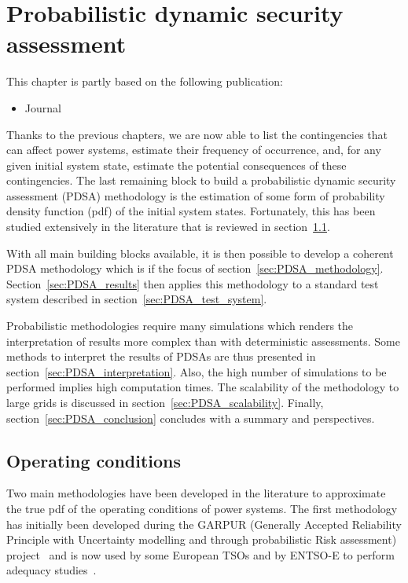 \chapter{Probabilistic dynamic security assessment}
\label{ch:DPSA}
\minitoc

\begin{tcolorbox}[width=\linewidth, sharp corners=all,
    colback=white!80!black,
    colframe=white!80!black]
This chapter is partly based on the following publication:
\begin{itemize}
    \item Journal
\end{itemize}
\end{tcolorbox}

Thanks to the previous chapters, we are now able to list the contingencies that can affect power systems, estimate their frequency of occurrence, and, for any given initial system state, estimate the potential consequences of these contingencies. The last remaining block to build a probabilistic dynamic security assessment (PDSA) methodology is the estimation of some form of probability density function (pdf) of the initial system states. Fortunately, this has been studied extensively in the literature that is reviewed in section~\ref{sec:operating_conditions}.

With all main building blocks available, it is then possible to develop a coherent PDSA methodology which is if the focus of section~\ref{sec:PDSA_methodology}. Section~\ref{sec:PDSA_results} then applies this methodology to a standard test system described in section~\ref{sec:PDSA_test_system}.

Probabilistic methodologies require many simulations which renders the interpretation of results more complex than with deterministic assessments. Some methods to interpret the results of PDSAs are thus presented in section~\ref{sec:PDSA_interpretation}. Also, the high number of simulations to be performed implies high computation times. The scalability of the methodology to large grids is discussed in section~\ref{sec:PDSA_scalability}. Finally, section~\ref{sec:PDSA_conclusion} concludes with a summary and perspectives.



\section{Operating conditions}
\label{sec:operating_conditions}

Two main methodologies have been developed in the literature to approximate the true pdf of the operating conditions of power systems. The first methodology has initially been developed during the GARPUR (Generally Accepted Reliability Principle with Uncertainty modelling and through probabilistic Risk assessment) project~\cite{StrathElia, StrathGARPUR} and is now used by some European TSOs and by ENTSO-E to perform adequacy studies~\cite{ACER_MC_year, EliaAdequacy, ENTSOE_MC_year}.

